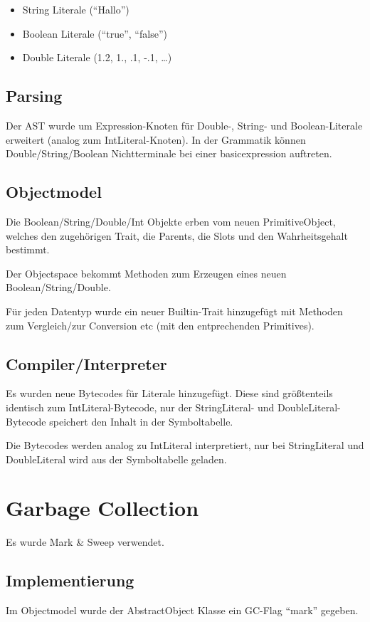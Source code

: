 \documentclass[12pt,a4paper,ngerman,parskip=full]{scrartcl}
\begin{document}
\begin{itemize}
\item String Literale (``Hallo'')
\item Boolean Literale (``true'', ``false'')
\item Double Literale (1.2, 1., .1, -.1, \ldots{})
\end{itemize}

\subsection{Parsing}
\label{sec:org9a5fe03}
Der AST wurde um Expression-Knoten für Double-, String- und Boolean-Literale erweitert (analog zum IntLiteral-Knoten).
In der Grammatik können Double/String/Boolean Nichtterminale bei einer basicexpression auftreten.

\subsection{Objectmodel}
\label{sec:org00b3848}
Die Boolean/String/Double/Int Objekte erben vom neuen PrimitiveObject, welches den zugehörigen Trait, die Parents, die Slots und den Wahrheitsgehalt bestimmt.

Der Objectspace bekommt Methoden zum Erzeugen eines neuen Boolean/String/Double.

Für jeden Datentyp wurde ein neuer Builtin-Trait hinzugefügt mit Methoden zum Vergleich/zur Conversion etc (mit den entprechenden Primitives).

\subsection{Compiler/Interpreter}
\label{sec:orgff4dad7}
Es wurden neue Bytecodes für Literale hinzugefügt.
Diese sind größtenteils identisch zum IntLiteral-Bytecode, nur der StringLiteral- und DoubleLiteral-Bytecode speichert den Inhalt in der Symboltabelle.

Die Bytecodes werden analog zu IntLiteral interpretiert, nur bei StringLiteral und DoubleLiteral wird aus der Symboltabelle geladen.

\section{Garbage Collection}
\label{sec:org52b32d1}
Es wurde Mark \& Sweep verwendet.

\subsection{Implementierung}
\label{sec:orgf803db4}
Im Objectmodel wurde der AbstractObject Klasse ein GC-Flag ``mark'' gegeben.
\end{document}
